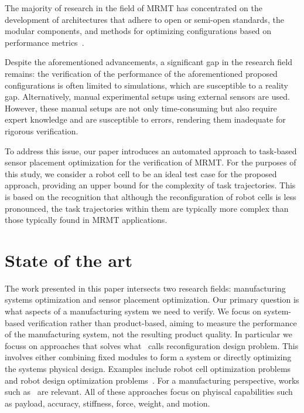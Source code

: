 \documentclass{svproc}
\begin{document}
The majority of research in the field of MRMT has concentrated on the development of architectures that adhere to open or semi-open standards, the modular components, and methods for optimizing configurations based on performance metrics~\cite{gadallaRecentAdvancesResearch2017, xuMethodDesignModular2017}.

Despite the aforementioned advancements, a significant gap in the research field remains: the verification of the performance of the aforementioned proposed configurations is often limited to simulations, which are susceptible to a reality gap. Alternatively, manual experimental setups using external sensors are used. However, these manual setups are not only time-consuming but also require expert knowledge and are susceptible to errors, rendering them inadequate for rigorous verification.

To address this issue, our paper introduces an automated approach to task-based sensor placement optimization for the verification of MRMT. For the purposes of this study, we consider a robot cell to be an ideal test case for the proposed approach, providing an upper bound for the complexity of task trajectories. This is based on the recognition that although the reconfiguration of robot cells is less pronounced, the task trajectories within them are typically more complex than those typically found in MRMT applications. 
\section{State of the art}
The work presented in this paper intersects two research fields: manufacturing systems optimization and sensor placement optimization. 
Our primary question is what aspects of a manufacturing system we need to verify. 
We focus on system-based verification rather than product-based, aiming to measure the performance of the manufacturing system, not the resulting product quality.
In particular we focuss on approaches that solves what~\cite{reconfigurable_production} calls reconfiguration design problem.
This involves either combining fixed modules to form a system or directly optimizing the systems physical design. 
Examples include robot cell optimization problems~\cite{previous_work, stiffness_placement} and robot design optimization problems~\cite{task_synthesis, ad-hoc_manipulator, multi_objective}.  
For a manufacturing perspective, works such as~\cite{johannes_1, johannes_2} are relevant. 
All of these approaches focus on phyiscal capabilities such as payload, accuracy, stiffness, force, weight, and motion. 
\end{document}
